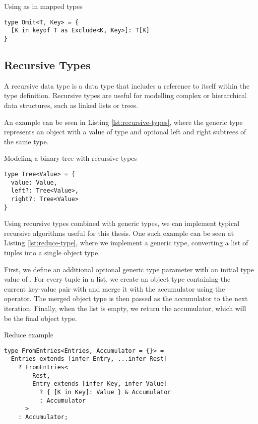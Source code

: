 \begin{listing}[ht]
  \caption{Using as in mapped types}\label{lst:mapped-as}
  \begin{verbatim}
type Omit<T, Key> = {
  [K in keyof T as Exclude<K, Key>]: T[K]
}
\end{verbatim}
\end{listing}

\subsection{Recursive Types}

A recursive data type is a data type that includes a reference to itself within the type definition. Recursive types are useful for modelling complex or hierarchical data structures, such as linked lists or trees.

An example can be seen in Listing \ref{lst:recursive-types}, where the  generic type represents an object with a value of type  and optional left and right subtrees of the same type.

\begin{listing}[ht]
  \caption{Modeling a binary tree with recursive types}\label{lst:recursive-types}
  \begin{verbatim}
type Tree<Value> = {
  value: Value,
  left?: Tree<Value>,
  right?: Tree<Value>
}
\end{verbatim}
\end{listing}

Using recursive types combined with generic types, we can implement typical recursive algorithms useful for this thesis. One such example can be seen at Listing \ref{lst:reduce-type}, where we implement a  generic type, converting a list of  tuples into a single object type.

First, we define an additional optional generic type parameter  with an initial type value of \code{{}}. For every tuple in a list, we create an object type containing the current key-value pair with  and merge it with the accumulator using the \vcode{&} operator. The merged object type is then passed as the accumulator to the next iteration. Finally, when the list is empty, we return the accumulator, which will be the final object type.

\begin{listing}[ht]
  \caption{Reduce example}\label{lst:reduce-type}
  \begin{verbatim}
type FromEntries<Entries, Accumulator = {}> =
  Entries extends [infer Entry, ...infer Rest]
    ? FromEntries<
        Rest,
        Entry extends [infer Key, infer Value]
          ? { [K in Key]: Value } & Accumulator
          : Accumulator
      >
    : Accumulator;
\end{verbatim}
\end{listing}

